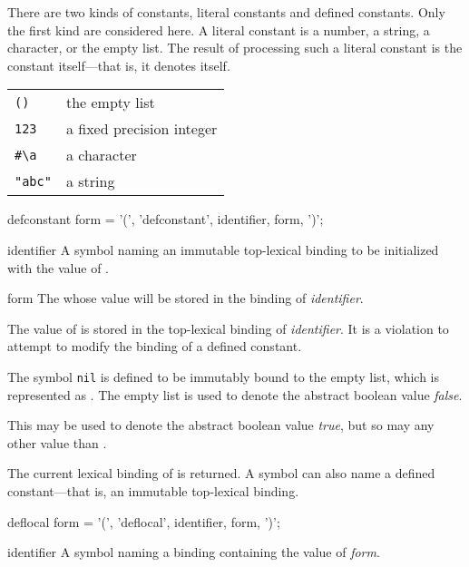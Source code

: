 \begin{optDefinition}
\noindent
%
\noindent
There are two kinds of constants, literal
constants and defined constants.  Only the
first kind are considered here.  A literal constant is a number, a string, a
character, or the empty list.  The result of processing such a literal constant
is the constant itself---that is, it denotes
itself.
%
\examples
\begin{tabular}{ll}
    \verb+()+ & the empty list\\
    \verb+123+ & a fixed precision integer\\
    \verb+#\a+ & a character\\
    \verb+"abc"+ & a string
\end{tabular}

%
\Syntax
\savesyntax{}\vbox{\syntax
defconstant form
   = '(', 'defconstant', identifier, form, ')';
\endsyntax}
%
\begin{arguments}
    \item[identifier] A symbol naming an immutable top-lexical binding to be
    initialized with the value of \form.

    \item[form] The \form{} whose value will be stored in the binding of {\em
        identifier}.
\end{arguments}
%
\remarks%
The value of \form{} is stored in the top-lexical binding of {\em
    identifier}.  It is a violation to attempt to modify the binding of a
defined constant.

%
\remarks%
The symbol {\tt nil} is defined to be immutably bound to the empty list, which
is represented as \nil{}.  The empty list is used to denote the abstract boolean
value {\em false}.

%
\remarks%
This may be used to denote the abstract boolean value {\em true}, but so may any
other value than \nil{}.

\noindent
The current lexical binding of  is
returned.  A symbol can also name a defined
constant---that is, an immutable top-lexical binding.

%
\Syntax
\savesyntax{}\vbox{\syntax
deflocal form
   = '(', 'deflocal', identifier, form, ')';
\endsyntax}
%
\begin{arguments}
    \item[identifier] A symbol naming a binding containing the value of {\em
        form}.


\end{arguments}
\end{optDefinition}
